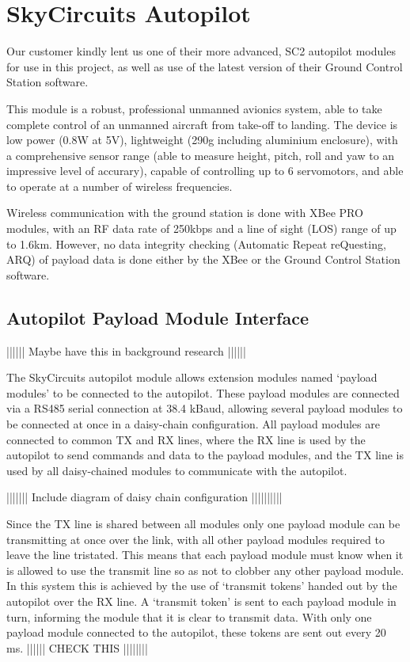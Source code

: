 \section{SkyCircuits Autopilot}

Our customer kindly lent us one of their more advanced, SC2 autopilot modules 
for use in this project, as well as use of the latest version of their Ground 
Control Station software.

This module \cite{SC2} is a robust, professional unmanned avionics system, 
able to take complete control of an unmanned aircraft from take-off to landing. 
The device is low power (0.8W at 5V), lightweight (290g including aluminium 
enclosure), with a comprehensive sensor range (able to measure height, pitch, 
roll and yaw to an impressive level of accurary), capable of controlling up to 
6 servomotors, and able to operate at a number of wireless frequencies.

Wireless communication with the ground station is done with 
XBee PRO modules, with an RF data rate of 250kbps and a 
line of sight (LOS) range of up to 1.6km. However, no data 
integrity checking (Automatic Repeat reQuesting, ARQ) of 
payload data is done either by the XBee or the Ground 
Control Station software.

\subsection{Autopilot Payload Module Interface}
\label{sec:autopilot_payload_interface}
|||||| Maybe have this in background research ||||||

The SkyCircuits autopilot module allows extension modules named `payload 
modules' to be connected to the autopilot. These payload modules are connected 
via a RS485 serial connection at 38.4 kBaud, allowing several payload modules
to be connected at once in a daisy-chain configuration. All payload modules are 
connected to common TX and RX lines, where the RX line is used by the
autopilot to send commands and data to the payload modules, and the TX
line is used by all daisy-chained modules to communicate with the autopilot.

||||||| Include diagram of daisy chain configuration ||||||||||

Since the TX line is shared between all modules only one payload module can be 
transmitting at once over the link, with all other payload modules required to
leave the line tristated. This means that each payload module must know when it is
allowed to use the transmit line so as not to clobber any other payload module.
In this system this is achieved by the use of `transmit tokens' handed out 
by the autopilot over the RX line. A `transmit token' is sent to each payload 
module in turn, informing the module that it is clear to transmit data. With 
only one payload module connected to the autopilot, these tokens are sent out 
every 20 ms. |||||| CHECK THIS ||||||||


